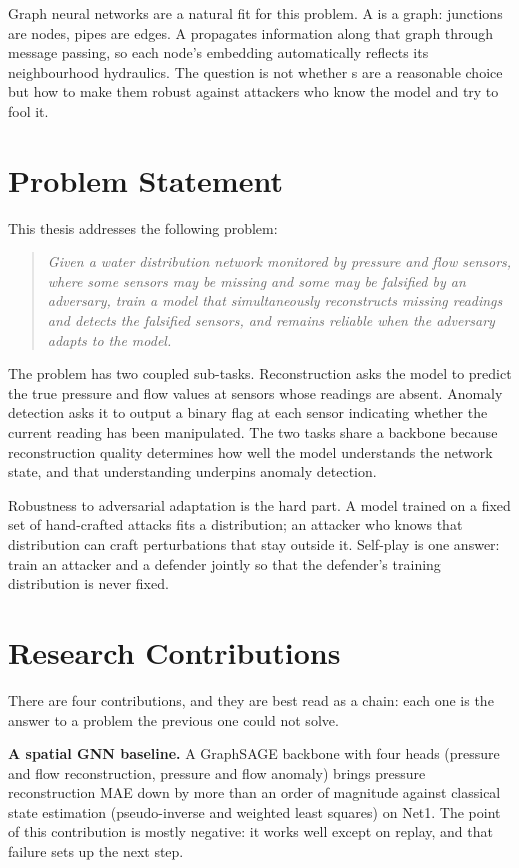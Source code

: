 Graph neural networks are a natural fit for this problem. A \wdn{}
is a graph: junctions are nodes, pipes are edges. A \gnn{} propagates
information along that graph through message passing, so each node's
embedding automatically reflects its neighbourhood hydraulics. The
question is not whether \gnn{}s are a reasonable choice but how to
make them robust against attackers who know the model and try to
fool it.

\section{Problem Statement}
\label{sec:problem}

This thesis addresses the following problem:

\begin{quote}
  \textit{Given a water distribution network monitored by pressure
  and flow sensors, where some sensors may be missing and some may be
  falsified by an adversary, train a model that simultaneously
  reconstructs missing readings and detects the falsified sensors,
  and remains reliable when the adversary adapts to the model.}
\end{quote}

The problem has two coupled sub-tasks. Reconstruction asks the model
to predict the true pressure and flow values at sensors whose
readings are absent. Anomaly detection asks it to output a binary
flag at each sensor indicating whether the current reading has been
manipulated. The two tasks share a backbone because reconstruction
quality determines how well the model understands the network state,
and that understanding underpins anomaly detection.

Robustness to adversarial adaptation is the hard part. A model
trained on a fixed set of hand-crafted attacks fits a distribution;
an attacker who knows that distribution can craft perturbations that
stay outside it. Self-play is one answer: train an attacker and a
defender jointly so that the defender's training distribution is
never fixed.

\section{Research Contributions}
\label{sec:contributions}

There are four contributions, and they are best read as a chain:
each one is the answer to a problem the previous one could not
solve.

\textbf{A spatial GNN baseline.} A GraphSAGE backbone with four
heads (pressure and flow reconstruction, pressure and flow anomaly)
brings pressure reconstruction MAE down by more than an order of
magnitude against classical state estimation (pseudo-inverse and
weighted least squares) on Net1. The point of this contribution is
mostly negative: it works well except on replay, and that failure
sets up the next step.

